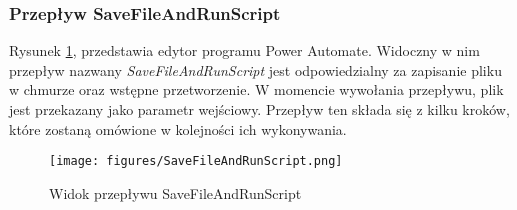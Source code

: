 


\subsubsection*{Przepływ SaveFileAndRunScript}
\label{childflow}
Rysunek \ref{fig:savefileandrunscript}, przedstawia edytor programu Power Automate. Widoczny w nim przepływ nazwany \emph{SaveFileAndRunScript} jest odpowiedzialny za zapisanie pliku w chmurze oraz wstępne przetworzenie. W momencie wywołania przepływu, plik jest przekazany jako parametr wejściowy. Przepływ ten składa się z kilku kroków, które zostaną omówione w kolejności ich wykonywania.

\begin{figure}[t]
    \centering
    \texttt{[image: figures/SaveFileAndRunScript.png]}
    \caption{Widok przepływu SaveFileAndRunScript}
    \label{fig:savefileandrunscript}
\end{figure}


